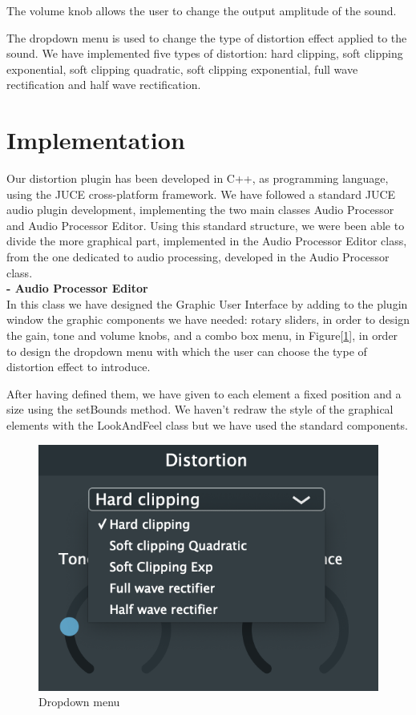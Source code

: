 \documentclass[letterpaper, 12pt]{article}
\begin{document}
	The volume knob allows the user to change the output amplitude of the sound.
	
	The dropdown menu is used to change the type of distortion effect applied to the sound. We have implemented five types of distortion: hard clipping, soft clipping exponential, soft clipping quadratic, soft clipping exponential, full wave rectification and half wave rectification.
	
	\section{Implementation}
	
	Our distortion plugin has been developed in C++, as programming language, using the JUCE cross-platform framework. We have followed a standard JUCE audio plugin development, implementing the two main classes Audio Processor and Audio Processor Editor. 
	Using this standard structure, we were been able to divide the more graphical part, implemented in the Audio Processor Editor class, from the one dedicated to audio processing, developed in the Audio Processor class.
	\\
	
	\textbf{-	Audio Processor Editor} 
\\
	
	In this class we have designed the Graphic User Interface by adding to the plugin window the graphic components we have needed: rotary sliders, in order to design the gain, tone and volume knobs, and a combo box menu, in Figure[\ref{fig:combobox}], in order to design the dropdown menu with which the user can choose the type of distortion effect to introduce.
	
	After having defined them, we have given to each element a fixed position and a size using the setBounds method.
	We haven’t redraw the style of the graphical elements with the LookAndFeel class but we have used the standard components.
	\\
	
	\begin{figure}[h!]
		\includegraphics[scale=0.6]{combobox.png}
		\centering
		\caption{Dropdown menu}
		\label{fig:combobox}
	\end{figure}
\end{document}
